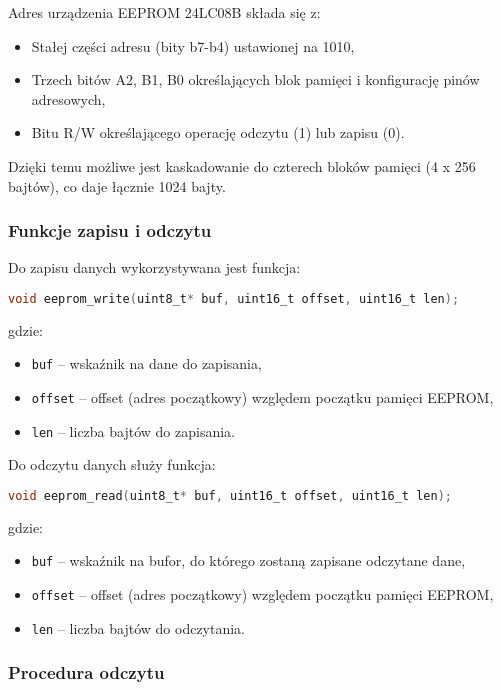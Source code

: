 \documentclass[a4paper,12pt]{report}
\begin{document}
Adres urządzenia EEPROM 24LC08B składa się z:
\begin{itemize}
    \item Stałej części adresu (bity b7-b4) ustawionej na 1010,
    \item Trzech bitów A2, B1, B0 określających blok pamięci i konfigurację pinów adresowych,
    \item Bitu R/W określającego operację odczytu (1) lub zapisu (0).
\end{itemize}

Dzięki temu możliwe jest kaskadowanie do czterech bloków pamięci (4 x 256 bajtów), co daje łącznie 1024 bajty.

\subsubsection*{Funkcje zapisu i odczytu}

Do zapisu danych wykorzystywana jest funkcja:
\begin{lstlisting}[language=C]
void eeprom_write(uint8_t* buf, uint16_t offset, uint16_t len);
\end{lstlisting}
gdzie:
\begin{itemize}
    \item \texttt{buf} – wskaźnik na dane do zapisania,
    \item \texttt{offset} – offset (adres początkowy) względem początku pamięci EEPROM,
    \item \texttt{len} – liczba bajtów do zapisania.
\end{itemize}

Do odczytu danych służy funkcja:
\begin{lstlisting}[language=C]
void eeprom_read(uint8_t* buf, uint16_t offset, uint16_t len);
\end{lstlisting}
gdzie:
\begin{itemize}
    \item \texttt{buf} – wskaźnik na bufor, do którego zostaną zapisane odczytane dane,
    \item \texttt{offset} – offset (adres początkowy) względem początku pamięci EEPROM,
    \item \texttt{len} – liczba bajtów do odczytania.
\end{itemize}

\subsubsection*{Procedura odczytu}
\end{document}
